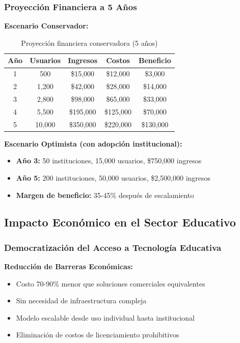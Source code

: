 \documentclass[12pt,a4paper]{report}
\begin{document}
\subsubsection{Proyección Financiera a 5 Años}

\textbf{Escenario Conservador:}
\begin{table}[h]
\centering
\caption{Proyección financiera conservadora (5 años)}
\begin{tabular}{|c|c|c|c|c|}
\hline
\textbf{Año} & \textbf{Usuarios} & \textbf{Ingresos} & \textbf{Costos} & \textbf{Beneficio} \\
\hline
1 & 500 & \$15,000 & \$12,000 & \$3,000 \\
\hline
2 & 1,200 & \$42,000 & \$28,000 & \$14,000 \\
\hline
3 & 2,800 & \$98,000 & \$65,000 & \$33,000 \\
\hline
4 & 5,500 & \$195,000 & \$125,000 & \$70,000 \\
\hline
5 & 10,000 & \$350,000 & \$220,000 & \$130,000 \\
\hline
\end{tabular}
\end{table}

\textbf{Escenario Optimista (con adopción institucional):}
\begin{itemize}
\item \textbf{Año 3:} 50 instituciones, 15,000 usuarios, \$750,000 ingresos
\item \textbf{Año 5:} 200 instituciones, 50,000 usuarios, \$2,500,000 ingresos
\item \textbf{Margen de beneficio:} 35-45\% después de escalamiento
\end{itemize}

\subsection{Impacto Económico en el Sector Educativo}

\subsubsection{Democratización del Acceso a Tecnología Educativa}

\textbf{Reducción de Barreras Económicas:}
\begin{itemize}
\item Costo 70-90\% menor que soluciones comerciales equivalentes
\item Sin necesidad de infraestructura compleja
\item Modelo escalable desde uso individual hasta institucional
\item Eliminación de costos de licenciamiento prohibitivos
\end{itemize}
\end{document}
